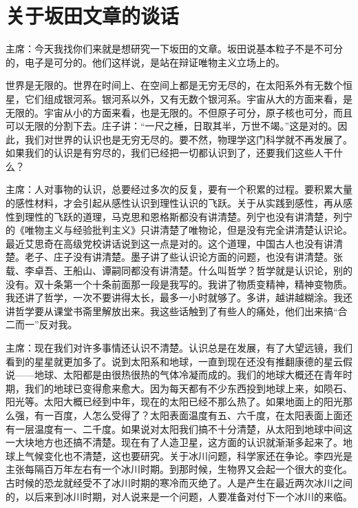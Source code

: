 \section[关于坂田文章的谈话（一九六四年八月二十四日）]{关于坂田文章的谈话}

主席：今天我找你们来就是想研究一下坂田的文章。坂田说基本粒子不是不可分的，电子是可分的。他们这样说，是站在辩证唯物主义立场上的。

世界是无限的。世界在时间上、在空间上都是无穷无尽的，在太阳系外有无数个恒星，它们组成银河系。银河系以外，又有无数个银河系。宇宙从大的方面来看，是无限的。宇宙从小的方面来看，也是无限的。不但原子可分，原子核也可分，而且可以无限的分割下去。庄子讲：“一尺之棰，日取其半，万世不竭。”这是对的。因此，我们对世界的认识也是无穷无尽的。要不然，物理学这门科学就不再发展了。如果我们的认识是有穷尽的，我们已经把一切都认识到了，还要我们这些人干什么？

主席：人对事物的认识，总要经过多次的反复，要有一个积累的过程。要积累大量的感性材料，才会引起从感性认识到理性认识的飞跃。关于从实践到感性，再从感性到理性的飞跃的道理，马克思和恩格斯都没有讲清楚。列宁也没有讲清楚，列宁的《唯物主义与经验批判主义》只讲清楚了唯物论，但是没有完全讲清楚认识论。最近艾思奇在高级党校讲话说到这一点是对的。这个道理，中国古人也没有讲清楚。老子、庄子没有讲清楚。墨子讲了些认识论方面的问题，也没有讲清楚。张载、李卓吾、王船山、谭嗣同都没有讲清楚。什么叫哲学？哲学就是认识论，别的没有。双十条第一个十条前面那一段是我写的。我讲了物质变精神，精神变物质。我还讲了哲学，一次不要讲得太长，最多一小时就够了。多讲，越讲越糊涂。我还讲哲学要从课堂书斋里解放出来。我这些话触到了有些人的痛处，他们出来搞“合二而一”反对我。

主席：现在我们对许多事情还认识不清楚。认识总是在发展，有了大望远镜，我们看到的星星就更加多了。说到太阳系和地球，一直到现在还没有推翻康德的星云假说——地球、太阳都是由很热很热的气体冷凝而成的。我们的地球大概还在青年时期，我们的地球已变得愈来愈大。因为每天都有不少东西投到地球上来，如陨石、阳光等。太阳大概已经到中年，现在的太阳已经不那么热了。如果地面上的阳光那么强，有一百度，人怎么受得了？太阳表面温度有五、六千度，在太阳表面上面还有一层温度有一、二千度。如果说对太阳我们搞不十分清楚，从太阳到地球中间这一大块地方也还搞不清楚。现在有了人造卫星，这方面的认识就渐渐多起来了。地球上气候变化也不清楚，这也要研究。关于冰川问题，科学家还在争论。李四光是主张每隔百万年左右有一个冰川时期。到那时候，生物界又会起一个很大的变化。古时候的恐龙就经受不了冰川时期的寒冷而灭绝了。人是产生在最近两次冰川之间的，以后来到冰川时期，对人说来是一个问题，人要准备对付下一个冰川的来临。


